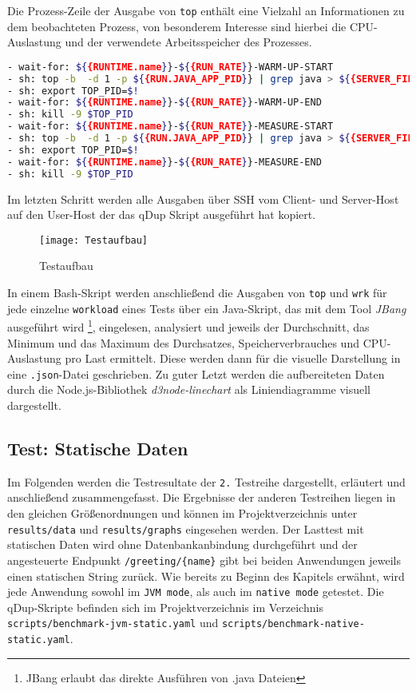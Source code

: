 Die Prozess-Zeile der Ausgabe von \verb|top| enthält eine Vielzahl an Informationen zu dem beobachteten Prozess, von besonderem
Interesse sind hierbei die CPU-Auslastung und der verwendete Arbeitsspeicher des Prozesses. \parencite{linuxTopManual}

\begin{lstlisting}[language=sh, caption=Auszug des qDup Skripts capture-platform-stats, captionpos=b]
- wait-for: ${{RUNTIME.name}}-${{RUN_RATE}}-WARM-UP-START
- sh: top -b  -d 1 -p ${{RUN.JAVA_APP_PID}} | grep java > ${{SERVER_FILE_PATH}}/output/${{RUNTIME.name}}-${{RUN_RATE}}-WARM-UP-top.out &
- sh: export TOP_PID=$!
- wait-for: ${{RUNTIME.name}}-${{RUN_RATE}}-WARM-UP-END
- sh: kill -9 $TOP_PID
- wait-for: ${{RUNTIME.name}}-${{RUN_RATE}}-MEASURE-START
- sh: top -b  -d 1 -p ${{RUN.JAVA_APP_PID}} | grep java > ${{SERVER_FILE_PATH}}/output/${{RUNTIME.name}}-${{RUN_RATE}}-MEASURE-top.out &
- sh: export TOP_PID=$!
- wait-for: ${{RUNTIME.name}}-${{RUN_RATE}}-MEASURE-END
- sh: kill -9 $TOP_PID
  \end{lstlisting}

Im letzten Schritt werden alle Ausgaben über SSH vom Client- und Server-Host auf den User-Host der das qDup Skript ausgeführt hat kopiert.

\begin{figure}[ht]
    \centering
    \texttt{[image: Testaufbau]}
    \caption{Testaufbau}
\end{figure}

In einem Bash-Skript werden anschließend die Ausgaben von \verb|top| und \verb|wrk| für jede einzelne \verb|workload| eines Tests
über ein Java-Skript, das mit dem Tool \textit{JBang} ausgeführt wird \footnote{JBang erlaubt das direkte Ausführen von .java Dateien},
eingelesen, analysiert und jeweils der Durchschnitt, das Minimum und das Maximum des Durchsatzes, Speicherverbrauches und CPU-Auslastung pro Last ermittelt.
Diese werden dann für die visuelle Darstellung in eine \verb|.json|-Datei geschrieben.
Zu guter Letzt werden die aufbereiteten Daten durch die Node.js-Bibliothek \textit{d3node-linechart} als Liniendiagramme visuell dargestellt.

\subsection{Test: Statische Daten}
\label{subsection:statische_daten}
Im Folgenden werden die Testresultate der \verb|2.| Testreihe dargestellt, erläutert und anschließend zusammengefasst.
Die Ergebnisse der anderen Testreihen liegen in den gleichen Größenordnungen und können im Projektverzeichnis unter \verb|results/data| und \verb|results/graphs| eingesehen werden.
Der Lasttest mit statischen Daten wird ohne Datenbankanbindung durchgeführt und der angesteuerte Endpunkt \verb|/greeting/{name}| gibt bei beiden Anwendungen
jeweils einen statischen String zurück. Wie bereits zu Beginn des Kapitels erwähnt, wird jede Anwendung sowohl im \verb|JVM mode|, als auch im
\verb|native mode| getestet.
Die qDup-Skripte befinden sich im Projektverzeichnis im Verzeichnis \verb|scripts/benchmark-jvm-static.yaml| und
\verb|scripts/benchmark-native-static.yaml|.

